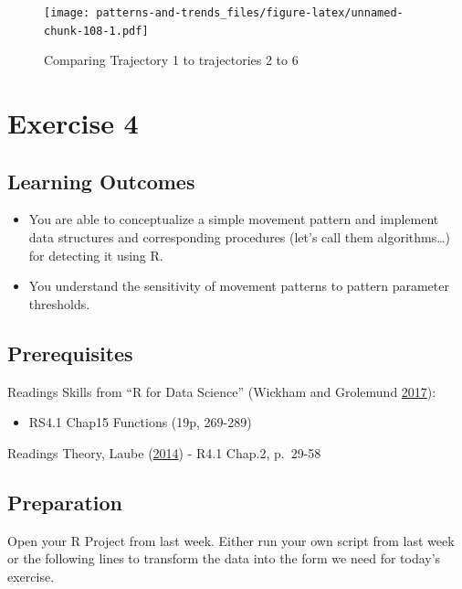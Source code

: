 \documentclass[]{book}
\providecommand{\tightlist}{%
  \setlength{\itemsep}{0pt}\setlength{\parskip}{0pt}}
\begin{document}
\begin{figure}
\centering
\texttt{[image: patterns-and-trends\_files/figure-latex/unnamed-chunk-108-1.pdf]}
\caption{\label{fig:unnamed-chunk-108}Comparing Trajectory 1 to trajectories 2 to 6}
\end{figure}

\hypertarget{exercise-4}{%
\chapter{Exercise 4}\label{exercise-4}}

\hypertarget{learning-outcomes-2}{%
\section{Learning Outcomes}\label{learning-outcomes-2}}

\begin{itemize}
\tightlist
\item
  You are able to conceptualize a simple movement pattern and implement data structures and corresponding procedures (let's call them algorithms\ldots{}) for detecting it using R.
\item
  You understand the sensitivity of movement patterns to pattern parameter thresholds.
\end{itemize}

\hypertarget{prerequisites-3}{%
\section{Prerequisites}\label{prerequisites-3}}

Readings Skills from ``R for Data Science'' (Wickham and Grolemund \protect\hyperlink{ref-wickham2017}{2017}):

\begin{itemize}
\tightlist
\item
  RS4.1 Chap15 Functions (19p, 269-289)
\end{itemize}

Readings Theory, Laube (\protect\hyperlink{ref-laube2014}{2014})
- R4.1 Chap.2, p.~29-58

\hypertarget{preparation}{%
\section{Preparation}\label{preparation}}

Open your R Project from last week. Either run your own script from last week or the following lines to transform the data into the form we need for today's exercise.
\end{document}
